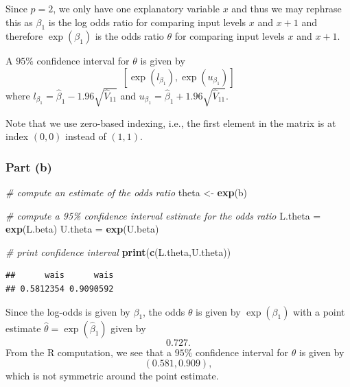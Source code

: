 \documentclass[
  11pt,
]{article}
\newenvironment{Shaded}{\begin{snugshade}}{\end{snugshade}}
\newcommand{\CommentTok}[1]{\textcolor[rgb]{0.56,0.35,0.01}{\textit{#1}}}
\newcommand{\FunctionTok}[1]{\textcolor[rgb]{0.13,0.29,0.53}{\textbf{#1}}}
\newcommand{\NormalTok}[1]{#1}
\newcommand{\OtherTok}[1]{\textcolor[rgb]{0.56,0.35,0.01}{#1}}
\begin{document}
Since \(p=2\), we only have one explanatory variable \(x\) and thus we
may rephrase this as \(\beta_1\) is the log odds ratio for comparing
input levels \(x\) and \(x+1\) and therefore \(\exp(\beta_1)\) is the
odds ratio \(\theta\) for comparing input levels \(x\) and \(x+1\).

A \(95\%\) confidence interval for \(\theta\) is given by \[
  \left[\exp(l_{\beta_1}),\exp(u_{\beta_1})\right]
\] where \(l_{\beta_1} = \hat{\beta}_1 - 1.96 \sqrt{\hat{V}_{1 1}}\) and
\(u_{\beta_1} = \hat{\beta}_1 + 1.96 \sqrt{\hat{V}_{1 1}}\).

Note that we use zero-based indexing, i.e., the first element in the
matrix is at index \((0,0)\) instead of \((1,1)\).

\hypertarget{part-b-2}{%
\subsubsection{Part (b)}\label{part-b-2}}


\begin{Shaded}
\begin{Highlighting}[]
\CommentTok{\# compute an estimate of the odds ratio}
\NormalTok{theta }\OtherTok{\textless{}{-}} \FunctionTok{exp}\NormalTok{(b)}

\CommentTok{\# compute a 95\% confidence interval estimate for the odds ratio}
\NormalTok{L.theta }\OtherTok{=} \FunctionTok{exp}\NormalTok{(L.beta)}
\NormalTok{U.theta }\OtherTok{=} \FunctionTok{exp}\NormalTok{(U.beta)}

\CommentTok{\# print confidence interval}
\FunctionTok{print}\NormalTok{(}\FunctionTok{c}\NormalTok{(L.theta,U.theta))}
\end{Highlighting}
\end{Shaded}

\begin{verbatim}
##      wais      wais 
## 0.5812354 0.9090592
\end{verbatim}

Since the log-odds is given by \(\beta_1\), the odds \(\theta\) is given
by \(\exp(\beta_1)\) with a point estimate
\(\hat{\theta} = \exp(\hat{\beta}_1)\) given by \[
  0.727.
\] From the R computation, we see that a \(95\%\) confidence interval
for \(\theta\) is given by \[
  (0.581, 0.909),
\] which is not symmetric around the point estimate.
\end{document}
